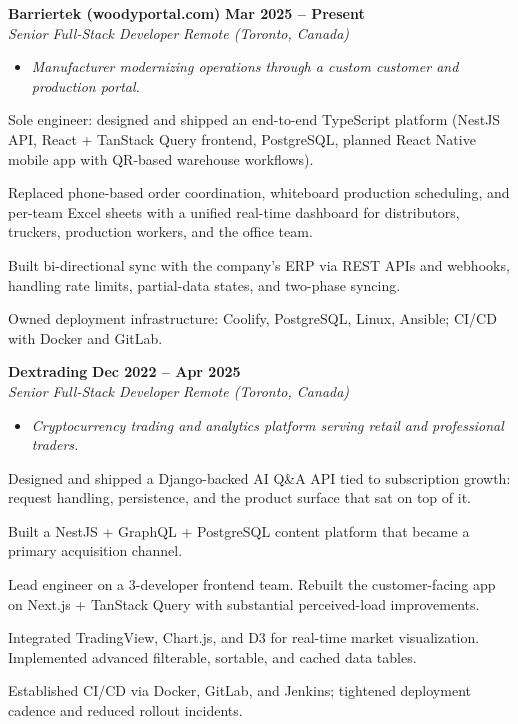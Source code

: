 \documentclass[letterpaper,10pt]{article}
\newcommand{\heading}[2]{
  \hspace{10pt}#1\hfill#2\\
}
\newcommand{\headingBf}[2]{
  \heading{\textbf{#1}}{\textbf{#2}}
}
\newcommand{\headingIt}[2]{
  \heading{\textit{#1}}{\textit{#2}}
}
\newenvironment{resume_list}{
  \vspace{-7pt}
  \begin{itemize}[itemsep=-2px, parsep=1pt, leftmargin=30pt]
}{
  \end{itemize}
  \vspace{2pt}
}
\newcommand{\companyDescription}[1]{
  \vspace{-7pt}
  \begin{itemize}[itemsep=-2px, parsep=1pt, leftmargin=12pt]
    \item[] {\color{textMuted}\textit{#1}}
  \end{itemize}
  \vspace{-4pt}
}
\begin{document}
  \headingBf{ Barriertek (woodyportal.com) }{ Mar 2025 -- Present }
  \headingIt{ Senior Full-Stack Developer }{ Remote (Toronto, Canada) }
  \companyDescription{ Manufacturer modernizing operations through a custom customer and production portal. }
  \begin{resume_list}
    \item Sole engineer: designed and shipped an end-to-end TypeScript platform (NestJS API, React + TanStack Query frontend, PostgreSQL, planned React Native mobile app with QR-based warehouse workflows).
    \item Replaced phone-based order coordination, whiteboard production scheduling, and per-team Excel sheets with a unified real-time dashboard for distributors, truckers, production workers, and the office team.
    \item Built bi-directional sync with the company's ERP via REST APIs and webhooks, handling rate limits, partial-data states, and two-phase syncing.
    \item Owned deployment infrastructure: Coolify, PostgreSQL, Linux, Ansible; CI/CD with Docker and GitLab.
  \end{resume_list}

  \headingBf{ Dextrading }{ Dec 2022 -- Apr 2025 }
  \headingIt{ Senior Full-Stack Developer }{ Remote (Toronto, Canada) }
  \companyDescription{ Cryptocurrency trading and analytics platform serving retail and professional traders. }
  \begin{resume_list}
    \item Designed and shipped a Django-backed AI Q\&A API tied to subscription growth: request handling, persistence, and the product surface that sat on top of it.
    \item Built a NestJS + GraphQL + PostgreSQL content platform that became a primary acquisition channel.
    \item Lead engineer on a 3-developer frontend team. Rebuilt the customer-facing app on Next.js + TanStack Query with substantial perceived-load improvements.
    \item Integrated TradingView, Chart.js, and D3 for real-time market visualization. Implemented advanced filterable, sortable, and cached data tables.
    \item Established CI/CD via Docker, GitLab, and Jenkins; tightened deployment cadence and reduced rollout incidents.
  \end{resume_list}
\end{document}
